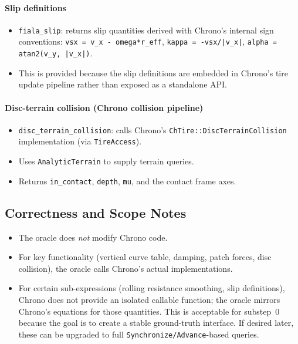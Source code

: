\paragraph{Slip definitions}
\begin{itemize}
  \item \texttt{fiala\_slip}: returns slip quantities derived with Chrono's internal sign conventions:
        \texttt{vsx = v\_x - omega*r\_eff}, \texttt{kappa = -vsx/|v\_x|}, \texttt{alpha = atan2(v\_y, |v\_x|)}.
  \item This is provided because the slip definitions are embedded in Chrono's tire update pipeline
        rather than exposed as a standalone API.
\end{itemize}

\paragraph{Disc-terrain collision (Chrono collision pipeline)}
\begin{itemize}
  \item \texttt{disc\_terrain\_collision}: calls Chrono's \texttt{ChTire::DiscTerrainCollision} implementation
        (via \texttt{TireAccess}).
  \item Uses \texttt{AnalyticTerrain} to supply terrain queries.
  \item Returns \texttt{in\_contact}, \texttt{depth}, \texttt{mu}, and the contact frame axes.
\end{itemize}

\subsection{Correctness and Scope Notes}
\begin{itemize}
  \item The oracle does \emph{not} modify Chrono code.
  \item For key functionality (vertical curve table, damping, patch forces, disc collision), the oracle
        calls Chrono's actual implementations.
  \item For certain sub-expressions (rolling resistance smoothing, slip definitions), Chrono does not provide
        an isolated callable function; the oracle mirrors Chrono's equations for those quantities.
        This is acceptable for substep~0 because the goal is to create a stable ground-truth interface.
        If desired later, these can be upgraded to full \texttt{Synchronize/Advance}-based queries.
\end{itemize}

